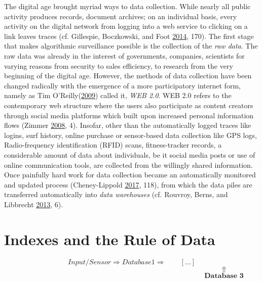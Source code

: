 \documentclass[12pt,twoside]{report}
\begin{document}
The digital age brought myriad ways to data collection. While nearly all public activity produces records, document archives; on an individual basis, every activity on the digital network from logging into a web service to clicking on a link leaves traces (cf. Gillespie, Boczkowski, and Foot \protect\hyperlink{ref-Gillespie2014}{2014}, 170). The first stage that makes algorithmic surveillance possible is the collection of the \emph{raw data}. The raw data was already in the interest of governments, companies, scientists for varying reasons from security to sales efficiency, to research from the very beginning of the digital age. However, the methods of data collection have been changed radically with the emergence of a more participatory internet form, namely as Tim O'Reilly(\protect\hyperlink{ref-Oreilly2009}{2009}) called it, \emph{WEB 2.0}. WEB 2.0 refers to the contemporary web structure where the users also participate as content creators through social media platforms which built upon increased personal information flows (Zimmer \protect\hyperlink{ref-Zimmer2008}{2008}, 4). Insofar, other than the automatically logged traces like logins, surf history, online purchase or sensor-based data collection like GPS logs, Radio-frequency identification (RFID) scans, fitness-tracker records, a considerable amount of data about individuals, be it social media posts or use of online communication tools, are collected from the willingly shared information. Once painfully hard work for data collection became an automatically monitored and updated process (Cheney-Lippold \protect\hyperlink{ref-Cheney2017}{2017}, 118), from which the data piles are transferred automatically into \emph{data warehouses} (cf. Rouvroy, Berns, and Libbrecht \protect\hyperlink{ref-Rouvroy2013}{2013}, 6).

\hypertarget{indexes-and-the-rule-of-data}{%
\section{Indexes and the Rule of Data}\label{indexes-and-the-rule-of-data}}

\[ Input/Sensor \Rightarrow Database 1 \Rightarrow \qquad [...]\]
\[    \qquad \qquad \qquad \qquad \qquad \qquad \qquad\qquad\qquad\qquad\qquad\qquad \qquad \Uparrow \]
\[ \qquad \qquad \qquad \qquad\qquad\qquad\qquad \qquad \qquad \qquad \qquad \qquad \qquad  \textbf{Database 3} \]
\end{document}
